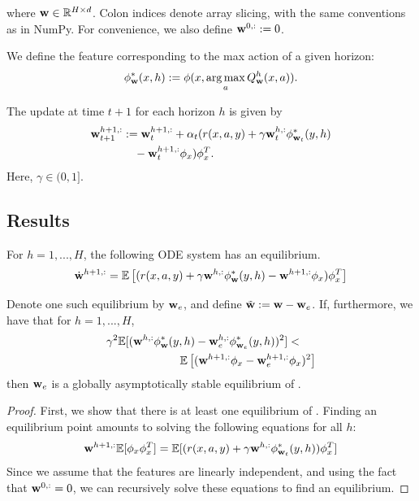 \begin{appendices}
\noindent where $\mathbf{w} \in \mathbb{R}^{H \times d}$. Colon indices denote array slicing, with the same conventions as in NumPy. For convenience, we also define $\mathbf{w}^{0, :} := 0$.

We define the feature corresponding to the max action of a given horizon:
\begin{equation*}
    \phi_{\mathbf{w}}^*(x, h) := \phi(x, \operatorname*{arg\,max}_{a} Q^h_{\mathbf{w}}(x, a)).
\end{equation*}

\noindent The update at time $t + 1$ for each horizon $h$ is given by
\begin{align*}
    \mathbf{w}_{t + 1}^{h + 1, :} &:= \mathbf{w}_t^{h + 1, :} + \alpha_t (r(x, a, y) + \gamma \mathbf{w}_t^{h, :} \phi^*_{\mathbf{w}_t}(y, h) \\
    &\quad - \mathbf{w}_t^{h + 1, :} \phi_x)\phi_x^T.
\end{align*}
Here, $\gamma \in (0, 1]$.

\subsection{Results}
\setcounter{proposition}{0}
\begin{proposition}\label{prop:odex}
For $h = 1, ..., H$, the following ODE system has an equilibrium.
\begin{equation}\label{eq:odex}
    \dot{\mathbf{w}}^{h + 1, :} = \mathbb{E}\left[(r(x, a, y) + \gamma \mathbf{w}^{h, :} \phi^*_{\mathbf{w}}(y, h) - \mathbf{w}^{h + 1, :} \phi_x)\phi_x^T\right]
\end{equation}

\noindent Denote one such equilibrium by $\mathbf{w}_e$, and define $\tilde{\mathbf{w}} := \mathbf{w} - \mathbf{w}_e$. If, furthermore, we have that for $h = 1, ..., H$,
\begin{align}\label{eq:odex-bound}
    \gamma^2\mathbb{E}[(\mathbf{w}^{h, :} \phi^*_{\mathbf{w}}&(y, h) - \mathbf{w}_e^{h, :} \phi^*_{\mathbf{w}_e}(y, h))^2 ] <\\
    &\quad \mathbb{E}\left[(\mathbf{w}^{h + 1, :} \phi_x - \mathbf{w}_e^{h + 1, :} \phi_x)^2\right]\nonumber
\end{align}
\noindent then $\mathbf{w}_e$ is a globally asymptotically stable equilibrium of .


\end{proposition}

\begin{proof}
First, we show that there is at least one equilibrium of . Finding an equilibrium point amounts to solving the following equations for all $h$:
\begin{equation*}
    \mathbf{w}^{h + 1, :} \mathbb{E}[\phi_x \phi_x^T] = \mathbb{E}[(r(x, a, y) + \gamma \mathbf{w}^{h, :} \phi^*_{\mathbf{w}_t}(y, h)) \phi_x^T]
\end{equation*}
Since we assume that the features are linearly independent, and using the fact that $\mathbf{w}^{0, :} = 0$, we can recursively solve these equations to find an equilibrium.


\end{proof}
\end{appendices}
